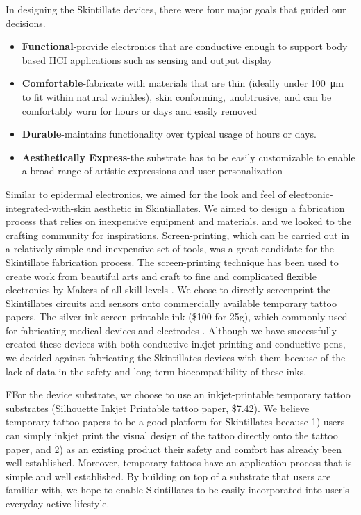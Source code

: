 \documentclass{sigchi}
\begin{document}
 In designing the Skintillate devices, there were four major goals that guided our decisions. 

\begin{itemize}
  \item \textbf{Functional}-provide electronics that are conductive enough to support body based HCI applications such as sensing and output display
  \item \textbf{Comfortable}-fabricate with materials that are thin (ideally under 100\SI{}{\micro\metre} to fit within natural wrinkles), skin conforming, unobtrusive, and can be comfortably worn for hours or days and easily removed
  \item \textbf{Durable}-maintains functionality over typical usage of hours or days. 
  \item \textbf{Aesthetically Express}-the substrate has to be easily customizable to enable a broad range of  artistic expressions and user personalization 
\end{itemize}

Similar to epidermal electronics, we aimed for the look and feel of electronic-integrated-with-skin aesthetic in Skintiallates. We aimed to design a fabrication process that relies on inexpensive equipment and materials, and we looked to the crafting community for inspirations. Screen-printing, which can be carried out in a relatively simple and inexpensive set of tools, was a great candidate for the Skintillate fabrication process. The screen-printing technique has been used to create work from beautiful arts and craft to fine and complicated flexible electronics by Makers of all skill levels \cite{Olberding:2014ds,Perry:CXGigkdt,Dillon:2008uc}. We chose to directly screenprint the Skintillates circuits and sensors onto commercially available temporary tattoo papers. The silver ink screen-printable ink (\$100 for 25g), which commonly used for fabricating medical devices and electrodes \cite{Cristea:2009uq,Rattfalt:2013ts}. Although we have successfully created these devices with both conductive inkjet printing and conductive pens, we decided against fabricating the Skintillates devices with them because of the lack of data in the safety and long-term biocompatibility of these inks. 

FFor the device substrate, we choose to use an inkjet-printable temporary tattoo substrates (Silhouette Inkjet Printable tattoo paper, \$7.42). We believe temporary tattoo papers to be a good platform for Skintillates because 1) users can simply inkjet print the visual design of the tattoo directly onto the tattoo paper, and 2) as an existing product their safety and comfort has already been well established. Moreover, temporary tattoos have an application process that is simple and well established. By building on top of a substrate that users are familiar with, we hope to enable Skintillates to be easily incorporated into user’s everyday active lifestyle.
\end{document}
